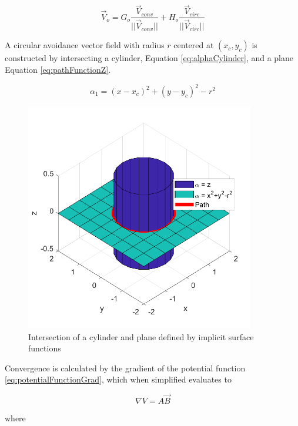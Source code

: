 \documentclass[numbered,pdftex]{ohio-etd}
\begin{document}
\begin{equation}
\overrightarrow{V}_{o} = G_o\frac{\overrightarrow{V}_{conv}}{||\overrightarrow{V}_{conv}||}+H_o\frac{\overrightarrow{V}_{circ}}{||\overrightarrow{V}_{circ}||}
\label{eq:obstComponents}
\end{equation}



A circular avoidance vector field with radius $r$ centered at $(x_c,y_c)$ is constructed by intersecting a cylinder, Equation \ref{eq:alphaCylinder}, and a plane Equation \ref{eq:pathFunctionZ}. 

\begin{equation}\label{eq:alphaCylinder}
\alpha_1 = (x-x_c)^2 + (y-y_c)^2-r^2
\end{equation}


\begin{figure}[H]
	\centering
	\includegraphics[width=10cm]{Figures/cylinderIntersection}
	\caption{Intersection of a cylinder and plane defined by implicit surface functions}
	\label{fig:cylinderIntersection}
\end{figure}



Convergence is calculated by the gradient of the potential function \ref{eq:potentialFunctionGrad}, which when simplified evaluates to

\begin{equation}
\nabla V = A\overrightarrow{B}
\label{eq:AB}
\end{equation}

\noindent
where
\end{document}
